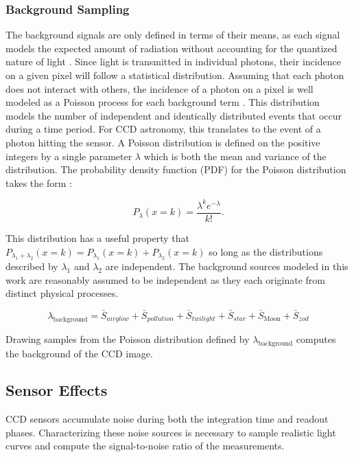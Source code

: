 \subsubsection{Background Sampling}

The background signals are only defined in terms of their means, as each signal models the expected amount of radiation without accounting for the quantized nature of light \cite{krag2003}. Since light is transmitted in individual photons, their incidence on a given pixel will follow a statistical distribution. Assuming that each photon does not interact with others, the incidence of a photon on a pixel is well modeled as a Poisson process for each background term \cite{frueh2019notes}. This distribution models the number of independent and identically distributed events that occur during a time period. For CCD astronomy, this translates to the event of a photon hitting the sensor. A Poisson distribution is defined on the positive integers by a single parameter $\lambda$ which is both the mean and variance of the distribution. The probability density function (PDF) for the Poisson distribution takes the form \cite{frueh2019notes}:

\begin{equation} \label{eq:poisson_pdf}
  P_\lambda(x=k) = \frac{\lambda^k e^{-\lambda}}{k!}.
\end{equation}

This distribution has a useful property that $P_{\lambda_1 + \lambda_2}(x=k) = P_{\lambda_1}(x=k) + P_{\lambda_2}(x=k)$ so long as the distributions described by $\lambda_1$ and $\lambda_2$ are independent. The background sources modeled in this work are reasonably assumed to be independent as they each originate from distinct physical processes.

\begin{equation} \label{eq:background_poisson}
  \lambda_\mathrm{background} = \bar{S}_{airglow} + \bar{S}_{pollution} + \bar{S}_{twilight} + \bar{S}_{star} + \bar{S}_\mathrm{Moon} + \bar{S}_{zod}
\end{equation}

Drawing samples from the Poisson distribution defined by $\lambda_\mathrm{background}$ computes the background of the CCD image. 

\subsection{Sensor Effects}

CCD sensors accumulate noise during both the integration time and readout phases. Characterizing these noise sources is necessary to sample realistic light curves and compute the signal-to-noise ratio of the measurements.

